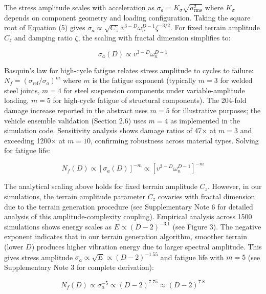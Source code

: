 \documentclass[11pt,letterpaper]{article}
\begin{document}
The stress amplitude scales with acceleration as $\sigma_a = K_\sigma \sqrt{a_{\text{rms}}^2}$ where $K_\sigma$ depends on component geometry and loading configuration. Taking the square root of Equation (5) gives $\sigma_a \propto \sqrt{C_z} \, v^{3-D} \omega_n^{D-1} \zeta^{-3/2}$. For fixed terrain amplitude $C_z$ and damping ratio $\zeta$, the scaling with fractal dimension simplifies to:

\begin{equation}
\sigma_a(D) \propto v^{3-D} \omega_n^{D-1}
\end{equation}

Basquin's law for high-cycle fatigue relates stress amplitude to cycles to failure: $N_f = (\sigma_{\text{ref}}/\sigma_a)^m$ where $m$ is the fatigue exponent (typically $m = 3$ for welded steel joints, $m = 4$ for steel suspension components under variable-amplitude loading, $m = 5$ for high-cycle fatigue of structural components)\cite{Basquin1910,Dowling2013}. The 204-fold damage increase reported in the abstract uses $m = 5$ for illustrative purposes; the vehicle ensemble validation (Section 2.6) uses $m = 4$ as implemented in the simulation code. Sensitivity analysis shows damage ratios of 47× at $m = 3$ and exceeding 1200× at $m = 10$, confirming robustness across material types. Solving for fatigue life:

\begin{equation}
N_f(D) \propto [\sigma_a(D)]^{-m} \propto [v^{3-D} \omega_n^{D-1}]^{-m}
\end{equation}

The analytical scaling above holds for fixed terrain amplitude $C_z$. However, in our simulations, the terrain amplitude parameter $C_z$ covaries with fractal dimension due to the terrain generation procedure (see Supplementary Note 6 for detailed analysis of this amplitude-complexity coupling). Empirical analysis across 1500 simulations shows energy scales as $E \propto (D-2)^{-3.1}$ (see Figure 3). The negative exponent indicates that in our terrain generation algorithm, smoother terrain (lower $D$) produces higher vibration energy due to larger spectral amplitude. This gives stress amplitude $\sigma_a \propto \sqrt{E} \propto (D-2)^{-1.55}$ and fatigue life with $m=5$ (see Supplementary Note 3 for complete derivation):

\begin{equation}
N_f(D) \propto \sigma_a^{-5} \propto (D-2)^{7.75} \approx (D-2)^{7.8}
\end{equation}
\end{document}
